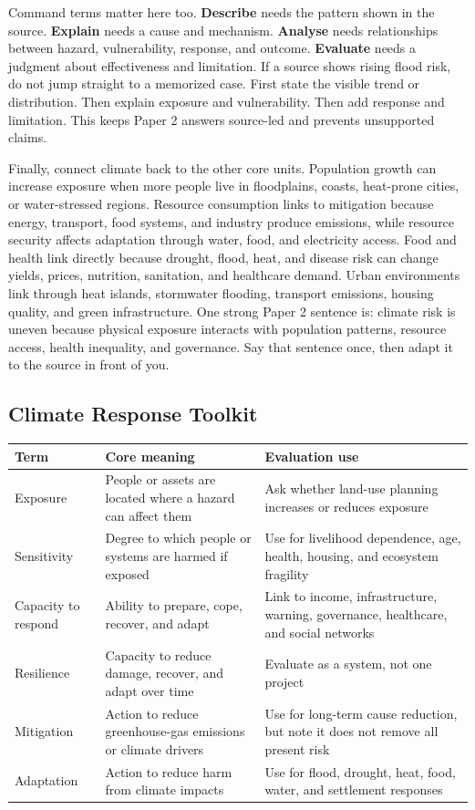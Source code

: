 \documentclass[11pt,a4paper]{article}
\newcommand{\exam}[1]{\textcolor{AccentTeal}{\textbf{#1}}}
\begin{document}
Command terms matter here too. \exam{Describe} needs the pattern shown in the
source. \exam{Explain} needs a cause and mechanism. \exam{Analyse} needs
relationships between hazard, vulnerability, response, and outcome.
\exam{Evaluate} needs a judgment about effectiveness and limitation. If a
source shows rising flood risk, do not jump straight to a memorized case. First
state the visible trend or distribution. Then explain exposure and
vulnerability. Then add response and limitation. This keeps Paper 2 answers
source-led and prevents unsupported claims.

Finally, connect climate back to the other core units. Population growth can
increase exposure when more people live in floodplains, coasts, heat-prone
cities, or water-stressed regions. Resource consumption links to mitigation
because energy, transport, food systems, and industry produce emissions, while
resource security affects adaptation through water, food, and electricity
access. Food and health link directly because drought, flood, heat, and disease
risk can change yields, prices, nutrition, sanitation, and healthcare demand.
Urban environments link through heat islands, stormwater flooding, transport
emissions, housing quality, and green infrastructure. One strong Paper 2
sentence is: climate risk is uneven because physical exposure interacts with
population patterns, resource access, health inequality, and governance. Say
that sentence once, then adapt it to the source in front of you.

\subsection{Climate Response Toolkit}

\begin{tabularx}{\textwidth}{L{0.23\textwidth}Y Y}
\toprule
\textbf{Term} & \textbf{Core meaning} & \textbf{Evaluation use} \\
\midrule
Exposure & People or assets are located where a hazard can affect them & Ask
whether land-use planning increases or reduces exposure \\
Sensitivity & Degree to which people or systems are harmed if exposed & Use for
livelihood dependence, age, health, housing, and ecosystem fragility \\
Capacity to respond & Ability to prepare, cope, recover, and adapt & Link to
income, infrastructure, warning, governance, healthcare, and social networks \\
Resilience & Capacity to reduce damage, recover, and adapt over time & Evaluate
as a system, not one project \\
Mitigation & Action to reduce greenhouse-gas emissions or climate drivers & Use
for long-term cause reduction, but note it does not remove all present risk \\
Adaptation & Action to reduce harm from climate impacts & Use for flood,
drought, heat, food, water, and settlement responses \\
\bottomrule
\end{tabularx}
\end{document}
